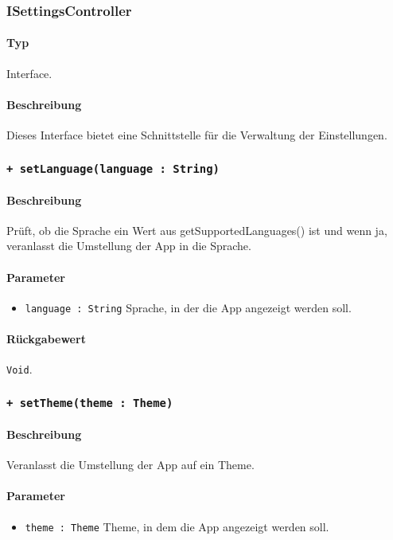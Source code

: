 \subsubsection{ISettingsController}
\paragraph*{Typ}
Interface.
\paragraph*{Beschreibung}
Dieses Interface bietet eine Schnittstelle für die Verwaltung der Einstellungen.

\subsubsection*{\texttt{+ setLanguage(language : String)}}%
\paragraph*{Beschreibung}
Prüft, ob die Sprache ein Wert aus getSupportedLanguages() ist und wenn ja, veranlasst die Umstellung der App in die Sprache.
\paragraph*{Parameter}
\begin{itemize}
    \item \texttt{language : String} Sprache, in der die App angezeigt werden soll.
\end{itemize}
\paragraph*{Rückgabewert}
\texttt{Void}.

\subsubsection*{\texttt{+ setTheme(theme : Theme)}}%
\paragraph*{Beschreibung}
Veranlasst die Umstellung der App auf ein Theme.
\paragraph*{Parameter}
\begin{itemize}
    \item \texttt{theme : Theme} Theme, in dem die App angezeigt werden soll.
\end{itemize}
